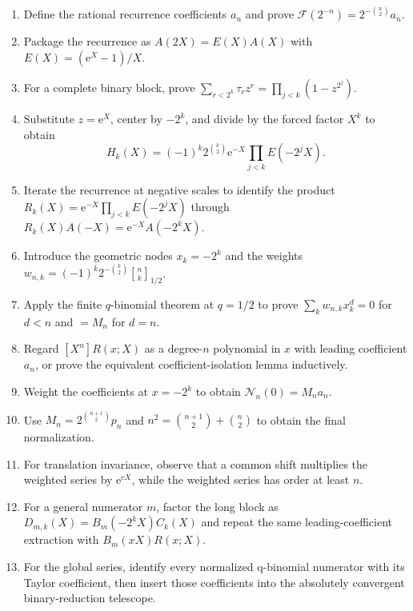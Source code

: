 \documentclass[11pt,oneside]{article}
\theoremstyle{definition}
\theoremstyle{remark}
\newcommand{\halfqbinom}[2]{{\genfrac{[}{]}{0pt}{}{#1}{#2}}_{1/2}}
\newcommand{\F}{\mathcal F}
\newcommand{\coeff}[2]{\left[#1^{#2}\right]}
\newcommand{\e}{\mathrm e}
\newcommand{\tm}{\tau}
\begin{document}
\begin{enumerate}[leftmargin=2.4em,label=\textbf{Step \arabic*.}]
\item Define the rational recurrence coefficients $a_n$ and prove
$\F(2^{-n})=2^{-\binom n2}a_n$.

\item Package the recurrence as
$A(2X)=E(X)A(X)$ with $E(X)=(\e^X-1)/X$.

\item For a complete binary block, prove
$\sum_{r<2^k}\tm_rz^r=\prod_{j<k}(1-z^{2^j})$.

\item Substitute $z=\e^X$, center by $-2^k$, and divide by the forced
factor $X^k$ to obtain
\[
 H_k(X)=(-1)^k2^{\binom{k}{2}}\e^{-X}
 \prod_{j<k}E(-2^jX).
\]

\item Iterate the recurrence at negative scales to identify the product
$R_k(X)=\e^{-X}\prod_{j<k}E(-2^jX)$ through
$R_k(X)A(-X)=\e^{-X}A(-2^kX)$.

\item Introduce the geometric nodes $x_k=-2^k$ and the weights
$w_{n,k}=(-1)^k2^{-\binom{k}{2}}\halfqbinom{n}{k}$.

\item Apply the finite $q$-binomial theorem at $q=1/2$ to prove
$\sum_kw_{n,k}x_k^d=0$ for $d<n$ and $=M_n$ for $d=n$.

\item Regard $\coeff{X}{n}R(x;X)$ as a degree-$n$ polynomial in $x$ with
leading coefficient $a_n$, or prove the equivalent coefficient-isolation
lemma inductively.

\item Weight the coefficients at $x=-2^k$ to obtain
$\mathcal N_n(0)=M_na_n$.

\item Use $M_n=2^{\binom{n+1}{2}}p_n$ and
$n^2=\binom{n+1}{2}+\binom n2$ to obtain the final normalization.

\item For translation invariance, observe that a common shift multiplies the
weighted series by $\e^{cX}$, while the weighted series has order at least
$n$.

\item For a general numerator $m$, factor the long block as
$D_{m,k}(X)=B_m(-2^kX)C_k(X)$ and repeat the same leading-coefficient
extraction with $B_m(xX)R(x;X)$.

\item For the global series, identify every normalized q-binomial numerator
with its Taylor coefficient, then insert those coefficients into the
absolutely convergent binary-reduction telescope.
\end{enumerate}
\end{document}
